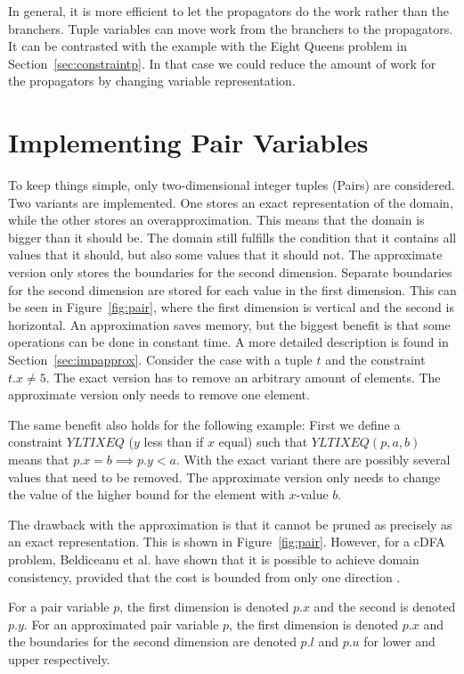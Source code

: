 \documentclass[a4paper,11pt]{article}
\begin{document}
In general, it is more efficient to let the propagators do the work rather than the branchers. Tuple variables can move work from the branchers to the propagators. It can be contrasted with the example with the Eight Queens problem in Section~\ref{sec:constraintp}. In that case we could reduce the amount of work for the propagators by changing variable representation.

\section{Implementing Pair Variables}
To keep things simple, only two-dimensional integer tuples (Pairs) are considered. Two variants are implemented. One stores an exact representation of the domain, while the other stores an overapproximation. This means that the domain is bigger than it should be. The domain still fulfills the condition that it contains all values that it should, but also some values that it should not. The approximate version only stores the boundaries for the second dimension. Separate boundaries for the second dimension are stored for each value in the first dimension. This can be seen in Figure~\ref{fig:pair}, where the first dimension is vertical and the second is horizontal. An approximation saves memory, but the biggest benefit is that some operations can be done in constant time. A more detailed description is found in Section~\ref{sec:impapprox}. Consider the case with a tuple $t$ and the constraint $t.x\neq5$. The exact version has to remove an arbitrary amount of elements. The approximate version only needs to remove one element. 

The same benefit also holds for the following example: First we define a constraint $\mathit{YLTIXEQ}$ ($y$ less than if $x$ equal) such that $\mathit{YLTIXEQ}(p, a, b)$ means that $p.x=b\implies p.y<a$. With the exact variant there are possibly several values that need to be removed. The approximate version only needs to change the value of the higher bound for the element with $x$-value $b$.

The drawback with the approximation is that it cannot be pruned as precisely as an exact representation. This is shown in Figure~\ref{fig:pair}. However, for a cDFA problem, Beldiceanu et al. have shown that it is possible to achieve domain consistency, provided that the cost is bounded from only one direction \cite{Beldiceanu675954}.

For a pair variable $p$, the first dimension is denoted $p.x$ and the second is denoted $p.y$. For an approximated pair variable $p$, the first dimension is denoted $p.x$ and the boundaries for the second dimension are denoted $p.l$ and $p.u$ for lower and upper respectively.
\end{document}
